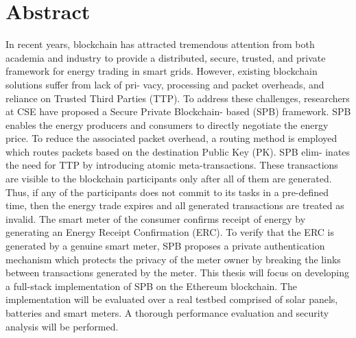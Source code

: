 \chapter*{Abstract}\label{abstract}
In recent years, blockchain has attracted tremendous attention from both academia and industry to provide a distributed, secure, trusted, and private framework for energy trading in smart grids. However, existing blockchain solutions suffer from lack of pri- vacy, processing and packet overheads, and reliance on Trusted Third Parties (TTP). To address these challenges, researchers at CSE have proposed a Secure Private Blockchain- based (SPB) framework. SPB enables the energy producers and consumers to directly negotiate the energy price. To reduce the associated packet overhead, a routing method is employed which routes packets based on the destination Public Key (PK). SPB elim- inates the need for TTP by introducing atomic meta-transactions. These transactions are visible to the blockchain participants only after all of them are generated. Thus, if any of the participants does not commit to its tasks in a pre-defined time, then the energy trade expires and all generated transactions are treated as invalid. The smart meter of the consumer confirms receipt of energy by generating an Energy Receipt Confirmation (ERC). To verify that the ERC is generated by a genuine smart meter, SPB proposes a private authentication mechanism which protects the privacy of the meter owner by breaking the links between transactions generated by the meter. This thesis will focus on developing a full-stack implementation of SPB on the Ethereum blockchain. The implementation will be evaluated over a real testbed comprised of solar panels, batteries and smart meters. A thorough performance evaluation and security analysis will be performed.